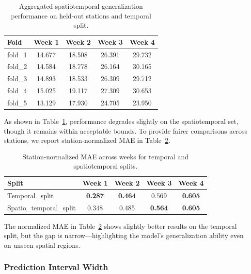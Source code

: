 \documentclass[a4paper,12pt]{article}
\begin{document}
\begin{table}[ht]
\centering
\begin{tabular}{lcccc}
\hline
\textbf{Fold} & \textbf{Week 1} & \textbf{Week 2} & \textbf{Week 3} & \textbf{Week 4} \\
\hline
fold\_1 & 14.677 & 18.508 & 26.391 & 29.732 \\
fold\_2 & 14.584 & 18.778 & 26.164 & 30.165 \\
fold\_3 & 14.893 & 18.533 & 26.309 & 29.712 \\
fold\_4 & 15.025 & 19.117 & 27.309 & 30.653 \\
fold\_5 & 13.129 & 17.930 & 24.705 & 23.950 \\
\hline
\end{tabular}
\caption{Aggregated spatiotemporal generalization performance on held-out stations and temporal split.}
\label{tab:spatiotemporal_generalization_aggregated}
\end{table}

\noindent As shown in Table~\ref{tab:spatiotemporal_generalization_aggregated}, performance degrades slightly on the spatiotemporal set, though it remains within acceptable bounds. To provide fairer comparisons across stations, we report station-normalized MAE in Table~\ref{tab:spatiotemporal_generalization}.

\begin{table}[ht]
\centering
\begin{tabular}{lcccc}
\hline
\textbf{Split} & \textbf{Week 1} & \textbf{Week 2} & \textbf{Week 3} & \textbf{Week 4} \\
\hline
Temporal\_split & \textbf{0.287} & \textbf{0.464} & 0.569 & \textbf{0.605} \\
Spatio\_temporal\_split & 0.348 & 0.485 & \textbf{0.564} & \textbf{0.605} \\
\hline
\end{tabular}
\caption{Station-normalized MAE across weeks for temporal and spatiotemporal splits.}
\label{tab:spatiotemporal_generalization}
\end{table}

\noindent The normalized MAE in Table~\ref{tab:spatiotemporal_generalization} shows slightly better results on the temporal split, but the gap is narrow—highlighting the model’s generalization ability even on unseen spatial regions.

\subsubsection{Prediction Interval Width}
\end{document}
